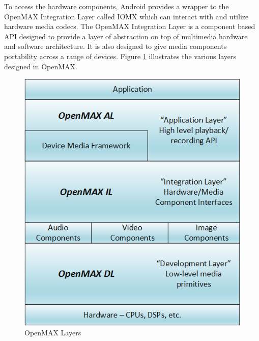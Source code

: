 To access the hardware components, Android provides a wrapper to the OpenMAX Integration Layer called IOMX which can interact with and utilize hardware media codecs. The OpenMAX Integration Layer is a component based API designed to provide a layer of abstraction on top of multimedia hardware and software architecture. It is also designed to give media components portability across a range of devices. Figure \ref{fig:OpenMAX} illustrates the various layers designed in OpenMAX. 
\begin{figure}[H]
\centering
\includegraphics[width=0.55\linewidth]{images/openmax.png}
\caption{OpenMAX Layers}
\label{fig:OpenMAX}
\end{figure}


